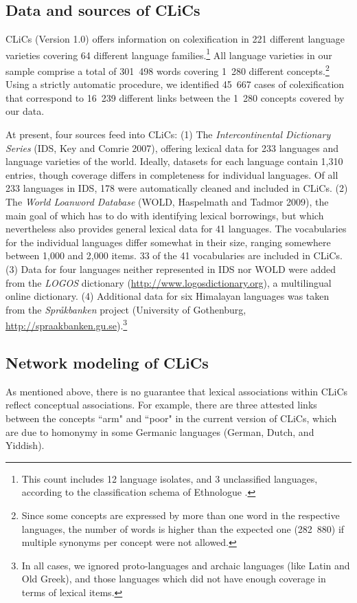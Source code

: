 \subsection{Data and sources of CLiCs}
CLiCs (Version 1.0) offers information on colexification in 221 different language varieties
covering 64 different language families.\footnote{This count includes 12 language isolates, and 3
unclassified languages, according to the classification schema of Ethnologue \cite{Lewis2013}.} All language
varieties in our sample comprise a total of 301~498 words covering 1~280 different
concepts.\footnote{Since some concepts are expressed by more than one word in the respective
languages, the number of words is higher than the expected one (282~880) if multiple synonyms per
concept were not allowed.} Using a strictly automatic procedure, we identified 45~667 cases of
colexification that correspond to 16~239 different links between the 1~280 concepts covered by our
data. 

At present, four sources feed into CLiCs: (1) The \emph{Intercontinental Dictionary Series} (IDS,
Key and Comrie 2007), offering lexical data for 233 languages and language varieties of the world.
Ideally, datasets for each language contain 1,310 entries, though coverage differs in completeness
for individual languages. Of all 233 languages in IDS, 178 were automatically cleaned and included
in CLiCs. (2) The \emph{World Loanword Database} (WOLD, Haspelmath and Tadmor 2009), the main goal
of which has to do with identifying lexical borrowings, but which nevertheless also provides general
lexical data for 41 languages. The vocabularies for the individual languages differ somewhat in
their size, ranging somewhere between 1,000 and 2,000 items. 33 of the 41 vocabularies are included
in CLiCs.  (3) Data for four languages neither represented in IDS nor WOLD were added from the
\emph{LOGOS} dictionary (\url{http://www.logosdictionary.org}), a multilingual online dictionary.
(4) Additional data for six Himalayan languages was taken from the \emph{Språkbanken} project
(University of Gothenburg, \url{http://spraakbanken.gu.se}).\footnote{In all cases, we ignored
proto-languages and archaic languages (like Latin and Old Greek), and those languages which did not
have enough coverage in terms of lexical items.}

\nocite{Wold2009}
\subsection{Network modeling of CLiCs}
As mentioned above, there is no guarantee that lexical associations within CLiCs reflect conceptual
associations. For example, there are three attested links between the concepts ``arm" and ``poor" in
the current version of CLiCs, which are due to homonymy in some Germanic languages (German, Dutch,
and Yiddish).
 
